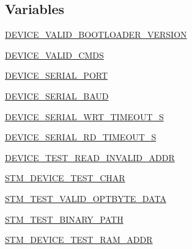 \subsection*{Variables}
\begin{DoxyCompactItemize}
\item 
\hyperlink{namespacestm__tools_1_1tests_1_1stmdevice__test_a6dc3bf26591dbf1524ea88bea719f0df}{D\+E\+V\+I\+C\+E\+\_\+\+V\+A\+L\+I\+D\+\_\+\+B\+O\+O\+T\+L\+O\+A\+D\+E\+R\+\_\+\+V\+E\+R\+S\+I\+ON}
\item 
\hyperlink{namespacestm__tools_1_1tests_1_1stmdevice__test_a1cc886c6cbb9f9d5e24d9a50e7e6f4d1}{D\+E\+V\+I\+C\+E\+\_\+\+V\+A\+L\+I\+D\+\_\+\+C\+M\+DS}
\item 
\hyperlink{namespacestm__tools_1_1tests_1_1stmdevice__test_a69ac6aa3b441f56a130f18e70d89529f}{D\+E\+V\+I\+C\+E\+\_\+\+S\+E\+R\+I\+A\+L\+\_\+\+P\+O\+RT}
\item 
\hyperlink{namespacestm__tools_1_1tests_1_1stmdevice__test_a18e6583da27755e0b79086411e0932a6}{D\+E\+V\+I\+C\+E\+\_\+\+S\+E\+R\+I\+A\+L\+\_\+\+B\+A\+UD}
\item 
\hyperlink{namespacestm__tools_1_1tests_1_1stmdevice__test_a59d8d0899dec790143b7694e3ba7869e}{D\+E\+V\+I\+C\+E\+\_\+\+S\+E\+R\+I\+A\+L\+\_\+\+W\+R\+T\+\_\+\+T\+I\+M\+E\+O\+U\+T\+\_\+S}
\item 
\hyperlink{namespacestm__tools_1_1tests_1_1stmdevice__test_a18b0d067d54847c27a1b1f67a69fd4af}{D\+E\+V\+I\+C\+E\+\_\+\+S\+E\+R\+I\+A\+L\+\_\+\+R\+D\+\_\+\+T\+I\+M\+E\+O\+U\+T\+\_\+S}
\item 
\hyperlink{namespacestm__tools_1_1tests_1_1stmdevice__test_a2b12982688ba32b3f1a082db30996b9b}{D\+E\+V\+I\+C\+E\+\_\+\+T\+E\+S\+T\+\_\+\+R\+E\+A\+D\+\_\+\+I\+N\+V\+A\+L\+I\+D\+\_\+\+A\+D\+DR}
\item 
\hyperlink{namespacestm__tools_1_1tests_1_1stmdevice__test_ac638f3e012ffed2ccd9871fd5632270c}{S\+T\+M\+\_\+\+D\+E\+V\+I\+C\+E\+\_\+\+T\+E\+S\+T\+\_\+\+C\+H\+AR}
\item 
\hyperlink{namespacestm__tools_1_1tests_1_1stmdevice__test_a8c0b9134cc5952be4e65467c961cf5c8}{S\+T\+M\+\_\+\+T\+E\+S\+T\+\_\+\+V\+A\+L\+I\+D\+\_\+\+O\+P\+T\+B\+Y\+T\+E\+\_\+\+D\+A\+TA}
\item 
\hyperlink{namespacestm__tools_1_1tests_1_1stmdevice__test_a0642febd39ae1f1bdd3b615f59ffbc4d}{S\+T\+M\+\_\+\+T\+E\+S\+T\+\_\+\+B\+I\+N\+A\+R\+Y\+\_\+\+P\+A\+TH}
\item 
\hyperlink{namespacestm__tools_1_1tests_1_1stmdevice__test_a3e0eb2bdf03a525813ba2b19346e2b21}{S\+T\+M\+\_\+\+D\+E\+V\+I\+C\+E\+\_\+\+T\+E\+S\+T\+\_\+\+R\+A\+M\+\_\+\+A\+D\+DR}
\end{DoxyCompactItemize}


